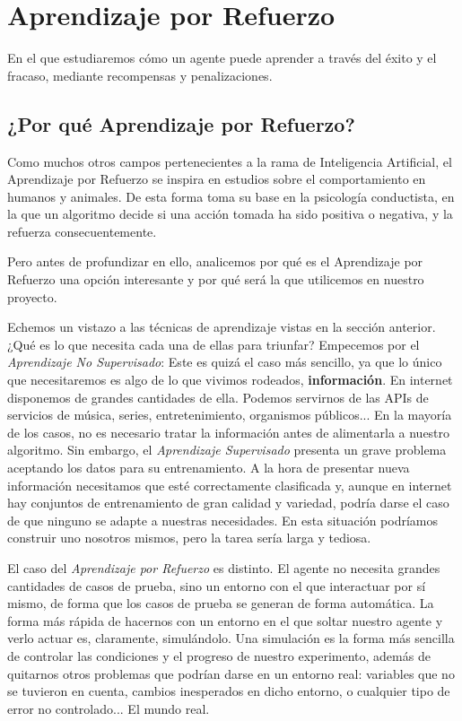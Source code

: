\chapter{Aprendizaje por Refuerzo}
\label{cap:reinforcementLearning}

En el que estudiaremos cómo un agente puede aprender a través del éxito y el fracaso, mediante recompensas y penalizaciones.


\section{¿Por qué Aprendizaje por Refuerzo?}
Como muchos otros campos pertenecientes a la rama de Inteligencia Artificial, el Aprendizaje por Refuerzo se inspira en estudios sobre el comportamiento en humanos y animales. De esta forma toma su base en la psicología conductista, en la que un algoritmo decide si una acción tomada ha sido positiva o negativa, y la refuerza consecuentemente.

Pero antes de profundizar en ello, analicemos por qué es el Aprendizaje por Refuerzo una opción interesante y por qué será la que utilicemos en nuestro proyecto.

Echemos un vistazo a las técnicas de aprendizaje vistas en la sección anterior. ¿Qué es lo que necesita cada una de ellas para triunfar? Empecemos por el \textit{Aprendizaje No Supervisado}: Este es quizá el caso más sencillo, ya que lo único que necesitaremos es algo de lo que vivimos rodeados, \textbf{información}. En internet disponemos de grandes cantidades de ella. Podemos servirnos de las APIs de servicios de música, series, entretenimiento, organismos públicos... En la mayoría de los casos, no es necesario tratar la información antes de alimentarla a nuestro algoritmo. Sin embargo, el \textit{Aprendizaje Supervisado} presenta un grave problema aceptando los datos para su entrenamiento. A la hora de presentar nueva información necesitamos que esté correctamente clasificada y, aunque en internet hay conjuntos de entrenamiento de gran calidad y variedad, podría darse el caso de que ninguno se adapte a nuestras necesidades. En esta situación podríamos construir uno nosotros mismos, pero la tarea sería larga y tediosa.

El caso del \textit{Aprendizaje por Refuerzo} es distinto. El agente no necesita grandes cantidades de casos de prueba, sino un entorno con el que interactuar por sí mismo, de forma que los casos de prueba se generan de forma automática. La forma más rápida de hacernos con un entorno en el que soltar nuestro agente y verlo actuar es, claramente, simulándolo. Una simulación es la forma más sencilla de controlar las condiciones y el progreso de nuestro experimento, además de quitarnos otros problemas que podrían darse en un entorno real: variables que no se tuvieron en cuenta, cambios inesperados en dicho entorno, o cualquier tipo de error no controlado... El mundo real.

